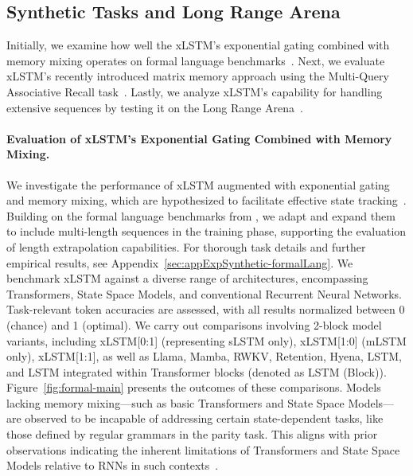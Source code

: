 \subsection{Synthetic Tasks and Long Range Arena}
\label{sec:ExpSyntethic}
Initially, we examine how well the xLSTM's exponential gating combined with memory mixing operates on formal language benchmarks~\citep{Deletang:23}. Next, we evaluate xLSTM’s recently introduced matrix memory approach using the Multi-Query Associative Recall task~\citep{Arora:23arxiv}. Lastly, we analyze xLSTM's capability for handling extensive sequences by testing it on the Long Range Arena~\citep{Tay:21}.

\paragraph{Evaluation of xLSTM's Exponential Gating Combined with Memory Mixing.} We investigate the performance of xLSTM augmented with exponential gating and memory mixing, which are hypothesized to facilitate effective state tracking~\citep{Merrill:24, Merrill:23}. Building on the formal language benchmarks from \citet{Deletang:23}, we adapt and expand them to include multi-length sequences in the training phase, supporting the evaluation of length extrapolation capabilities. For thorough task details and further empirical results, see Appendix~\ref{sec:appExpSynthetic-formalLang}. We benchmark xLSTM against a diverse range of architectures, encompassing Transformers, State Space Models, and conventional Recurrent Neural Networks. Task-relevant token accuracies are assessed, with all results normalized between 0 (chance) and 1 (optimal). We carry out comparisons involving 2-block model variants, including xLSTM[0:1] (representing sLSTM only), xLSTM[1:0] (mLSTM only), xLSTM[1:1], as well as Llama, Mamba, RWKV, Retention, Hyena, LSTM, and LSTM integrated within Transformer blocks (denoted as LSTM (Block)). Figure~\ref{fig:formal-main} presents the outcomes of these comparisons. Models lacking memory mixing—such as basic Transformers and State Space Models—are observed to be incapable of addressing certain state-dependent tasks, like those defined by regular grammars in the parity task. This aligns with prior observations indicating the inherent limitations of Transformers and State Space Models relative to RNNs in such contexts~\citep{Merrill:24, Merrill:23, Deletang:23}.

